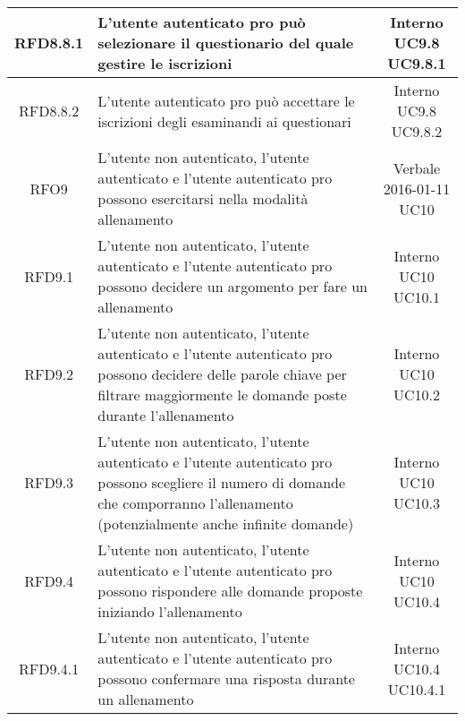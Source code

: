 \begin{longtable}{|c|>{\centering}m{7cm}|c|}
			 \hypertarget{{RFD8.8.1}}{{RFD8.8.1}} & L’utente autenticato pro può selezionare
il questionario del quale gestire le
iscrizioni & \makecell{Interno\\ UC9.8 \\UC9.8.1 } \\ \hline
			 \hypertarget{{RFD8.8.2}}{{RFD8.8.2}} & L’utente autenticato pro può accettare le
iscrizioni degli esaminandi ai questionari & \makecell{Interno\\ UC9.8 \\UC9.8.2 } \\ \hline
			 \hypertarget{{RFO9}}{{RFO9}} & L’utente non autenticato, l’utente
autenticato e l’utente autenticato pro
possono esercitarsi nella modalità
allenamento & \makecell{Verbale 2016-01-11\\ UC10 } \\ \hline
			 \hypertarget{{RFD9.1}}{{RFD9.1}} & L’utente non autenticato, l’utente
autenticato e l’utente autenticato pro
possono decidere un argomento per fare
un allenamento & \makecell{Interno\\ UC10 \\UC10.1 } \\ \hline
			 \hypertarget{{RFD9.2}}{{RFD9.2}} & L’utente non autenticato, l’utente
autenticato e l’utente autenticato pro
possono decidere delle parole chiave per
filtrare maggiormente le domande poste
durante l’allenamento & \makecell{Interno\\ UC10 \\UC10.2 } \\ \hline
			 \hypertarget{{RFD9.3}}{{RFD9.3}} & L’utente non autenticato, l’utente
autenticato e l’utente autenticato pro
possono scegliere il numero di domande
che comporranno l’allenamento
(potenzialmente anche infinite domande) & \makecell{Interno\\ UC10 \\UC10.3 } \\ \hline
			 \hypertarget{{RFD9.4}}{{RFD9.4}} & L’utente non autenticato, l’utente
autenticato e l’utente autenticato pro
possono rispondere alle domande
proposte iniziando l’allenamento & \makecell{Interno\\ UC10 \\UC10.4 } \\ \hline
			 \hypertarget{{RFD9.4.1}}{{RFD9.4.1}} & L’utente non autenticato, l’utente
autenticato e l’utente autenticato pro
possono confermare una risposta durante
un allenamento & \makecell{Interno\\ UC10.4 \\UC10.4.1 } \\ \hline

\end{longtable}
